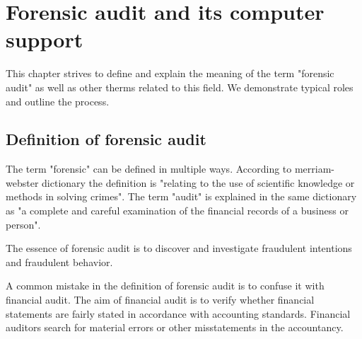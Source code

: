 \chapter{Forensic audit and its computer support}




This chapter strives to define and explain the meaning of the term "forensic audit" as well as other therms related to this field. We demonstrate typical roles and outline the process.


\section{Definition of forensic audit}
The term "forensic" can be defined in multiple ways. According to merriam-webster dictionary  the definition is "relating to the use of scientific knowledge or methods in solving crimes". The term "audit" is explained in the same dictionary as "a complete and careful examination of the financial records of a business or person". 

The essence of forensic audit is to discover and investigate fraudulent intentions and fraudulent behavior. 

A common mistake in the definition of forensic audit is to confuse it with financial audit. The aim of financial audit is to verify whether financial statements are fairly stated in accordance with accounting standards. Financial auditors search for material errors or other misstatements in the accountancy.

